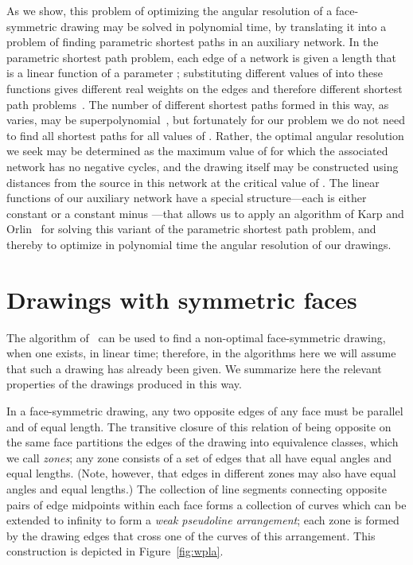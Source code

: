 \documentclass[11pt,letter]{article}
\begin{document}
As we show, this problem of optimizing the angular resolution of a
face-symmetric drawing may be solved in polynomial time, by
translating it into a problem of finding parametric shortest paths in
an auxiliary network. In the parametric shortest path problem, each
edge of a network is given a length that is a linear function of a
parameter ; substituting different values of  into
these functions gives different real weights on the edges and
therefore different shortest path problems~\cite{Gus-JACM-83}. The
number of different shortest paths formed in this way, as  varies, may
be superpolynomial~\cite{Car-84}, but fortunately for our problem we
do not need to find all shortest paths for all values of . Rather, the
optimal angular resolution we seek may be determined as the maximum
value of  for which the associated network has no negative
cycles, and the drawing itself may be constructed using distances from
the source in this network at the critical value of . The
linear functions of our auxiliary network have a special
structure---each is either constant or a constant minus
---that allows us to apply an algorithm of Karp and
Orlin~\cite{KarOrl-DAM-81} for solving this variant of the parametric
shortest path problem, and thereby to optimize in polynomial time the
angular resolution of our drawings.

\section{Drawings with symmetric faces}
\label{section:drawings}

The algorithm of~\cite{Epp-GD-04} can be used to find a non-optimal face-symmetric
drawing, when one exists, in linear time; therefore, in the algorithms
here we will assume that such a drawing has already been given. We
summarize here the relevant properties of the drawings produced in
this way.

In a face-symmetric drawing, any two opposite edges of any face must
be parallel and of equal length. The transitive closure of this
relation of being opposite on the same face partitions the edges of
the drawing into equivalence classes, which we call \emph{zones}; any
zone consists of a set of edges that all have equal angles and equal
lengths. (Note, however, that edges in different zones may also have
equal angles and equal lengths.) The collection of line segments
connecting opposite pairs of edge midpoints within each face forms a
collection of curves which can be extended to infinity to form a
\emph{weak pseudoline arrangement}; each zone is formed by the drawing
edges that cross one of the curves of this arrangement. This
construction is depicted in Figure~\ref{fig:wpla}.
\end{document}
